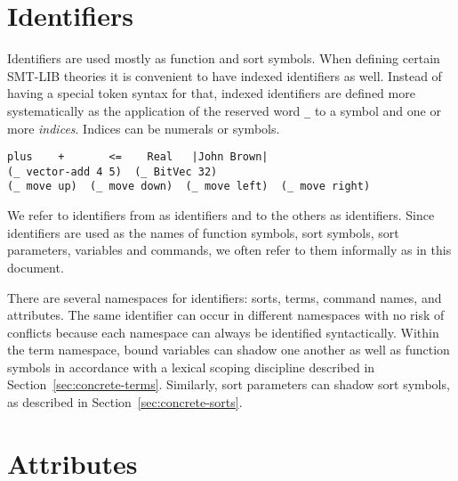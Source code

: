 \section{Identifiers} \label{sec:identifiers}

Identifiers are used mostly as function and sort symbols.
When defining certain SMT-LIB theories 
it is convenient to have indexed identifiers as well.
Instead of having a special token syntax for that,
indexed identifiers are defined more systematically 
as the application of the reserved word \verb+_+
to a symbol and one or more \emph{indices}.
Indices can be numerals or symbols.
\bigskip

\cIdentifiers
\bigskip

\begin{lstlisting}[linewidth=38em]
plus    +       <=    Real   |John Brown|
(_ vector-add 4 5)  (_ BitVec 32)
(_ move up)  (_ move down)  (_ move left)  (_ move right)
\end{lstlisting}

We refer to identifiers from  as  identifiers
and to the others as  identifiers.
Since identifiers are used as the names of function symbols, sort symbols,
sort parameters, variables and commands, we often refer to them informally 
as  in this document.
  
\begin{remark}
There are several namespaces for identifiers:
sorts, terms, command names, and attributes. 
The same identifier can occur in different namespaces with no risk of conflicts
because each namespace can always be identified syntactically.
Within the term namespace, bound variables can shadow one another as well as
function symbols in accordance with a lexical scoping discipline described 
in Section~\ref{sec:concrete-terms}. 
Similarly, sort parameters can shadow sort symbols,
as described in Section~\ref{sec:concrete-sorts}.
\end{remark}


\section{Attributes}

